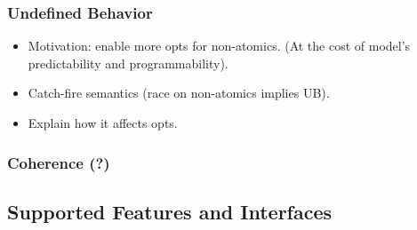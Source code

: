 \subsubsection{Undefined Behavior}
\label{sec:bgrnd-ub}

\begin{itemize}
  \item Motivation: enable more opts for non-atomics.
        (At the cost of model's predictability and programmability).
  \item Catch-fire semantics (race on non-atomics implies UB).
  \item Explain how it affects opts.
\end{itemize}

\subsubsection{Coherence (?)}
\label{sec:background-coh}

\subsection{Supported Features and Interfaces}

